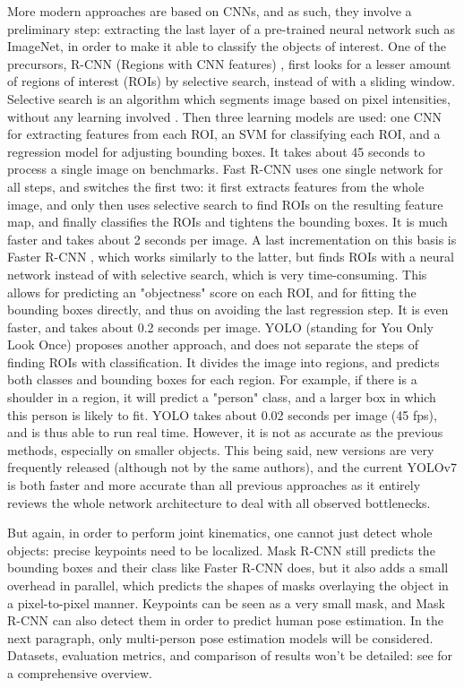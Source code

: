 \clearpage
More modern approaches are based on CNNs, and as such, they involve a preliminary step: extracting the last layer of a pre-trained neural network such as ImageNet, in order to make it able to classify the objects of interest. One of the precursors, R-CNN (Regions with CNN features) \cite{Girshick2014}, first looks for a lesser amount of regions of interest (ROIs) by selective search, instead of with a sliding window. Selective search is an algorithm which segments image based on pixel intensities, without any learning involved \cite{Uijlings2013}. Then three learning models are used: one CNN for extracting features from each ROI, an SVM for classifying each ROI, and a regression model for adjusting bounding boxes. It takes about 45 seconds to process a single image on benchmarks. Fast R-CNN \cite{Girshick2015} uses one single network for all steps, and switches the first two: it first extracts features from the whole image, and only then uses selective search to find ROIs on the resulting feature map, and finally classifies the ROIs and tightens the bounding boxes. It is much faster and takes about 2 seconds per image. A last incrementation on this basis is Faster R-CNN \cite{Ren2015}, which works similarly to the latter, but finds ROIs with a neural network instead of with selective search, which is very time-consuming. This allows for predicting an "objectness" score on each ROI, and for fitting the bounding boxes directly, and thus on avoiding the last regression step. It is even faster, and takes about 0.2 seconds per image. YOLO (standing for You Only Look Once) \cite{Redmon2016} proposes another approach, and does not separate the steps of finding ROIs with classification. It divides the image into regions, and predicts both classes and bounding boxes for each region. For example, if there is a shoulder in a region, it will predict a "person" class, and a larger box in which this person is likely to fit. YOLO takes about 0.02 seconds per image (45 fps), and is thus able to run real time. However, it is not as accurate as the previous methods, especially on smaller objects. This being said, new versions are very frequently released (although not by the same authors), and the current YOLOv7 \cite{Wang2022b} is both faster and more accurate than all previous approaches as it entirely reviews the whole network architecture to deal with all observed bottlenecks.

But again, in order to perform joint kinematics, one cannot just detect whole objects: precise keypoints need to be localized. Mask R-CNN \cite{He2017} still predicts the bounding boxes and their class like Faster R-CNN does, but it also adds a small overhead in parallel, which predicts the shapes of masks overlaying the object in a pixel-to-pixel manner. Keypoints can be seen as a very small mask, and Mask R-CNN can also detect them in order to predict human pose estimation. In the next paragraph, only multi-person pose estimation models will be considered. Datasets, evaluation metrics, and comparison of results won't be detailed: see \cite{Topham2021} for a comprehensive overview.

